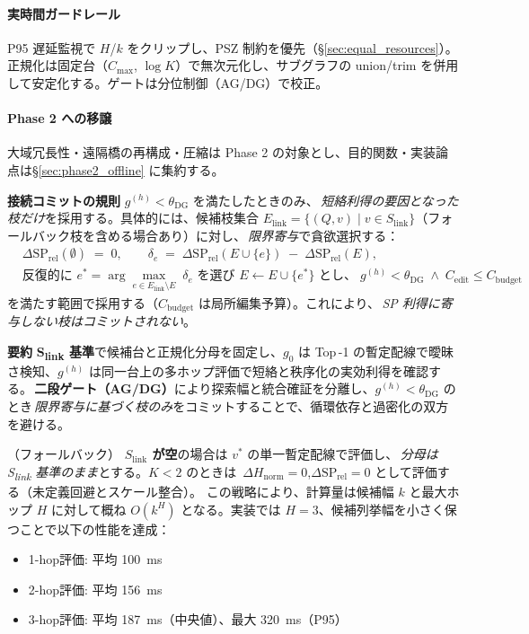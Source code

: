 \documentclass[ja=standard,xelatex]{bxjsarticle}
\begin{document}
\paragraph{実時間ガードレール}
P95 遅延監視で $H$/$k$ をクリップし、PSZ 制約を優先（\S\ref{sec:equal_resources}）。正規化は固定台（$C_{\max}$, $\log K$）で無次元化し、サブグラフの union/trim を併用して安定化する。ゲートは分位制御（AG/DG）で校正。

\paragraph{Phase 2 への移譲}
大域冗長性・遠隔橋の再構成・圧縮は Phase 2 の対象とし、目的関数・実装論点は\S\ref{sec:phase2_offline} に集約する。

\textbf{接続コミットの規則}\; $g^{(h)}<\theta_{\mathrm{DG}}$ を満たしたときのみ、\,\emph{短絡利得の要因となった枝だけ}を採用する。具体的には、候補枝集合 $E_{\mathrm{link}}{=}\{(Q,v)\mid v\in S_{\mathrm{link}}\}$（フォールバック枝を含める場合あり）に対し、\,\emph{限界寄与}で貪欲選択する：
\begin{align}
  &\Delta \mathrm{SP}_{\mathrm{rel}}(\emptyset)\;=\;0,\qquad
  \delta_e\;=\;\Delta \mathrm{SP}_{\mathrm{rel}}(E\cup\{e\})\;{-}\;\Delta \mathrm{SP}_{\mathrm{rel}}(E),\\
  &\text{反復的に } e^*{=}\arg\max_{e\in E_{\mathrm{link}}\setminus E}\;\delta_e \text{ を選び } E\leftarrow E\cup\{e^*\}\text{ とし、}\;g^{(h)}<\theta_{\mathrm{DG}}\;\land\; C_{\mathrm{edit}}\le C_{\mathrm{budget}}
\end{align}
を満たす範囲で採用する（$C_{\mathrm{budget}}$ は局所編集予算）。これにより、\,\emph{SP 利得に寄与しない枝はコミットされない}。

\textbf{要約}\; \textbf{S\textsubscript{link} 基準}で候補台と正規化分母を固定し、$g_0$ は Top\,\mbox{-}1 の暫定配線で曖昧さ検知、$g^{(h)}$ は同一台上の多ホップ評価で短絡と秩序化の実効利得を確認する。\,\textbf{二段ゲート（AG/DG）}により探索幅と統合確証を分離し、$g^{(h)}<\theta_{\mathrm{DG}}$ のとき\,\emph{限界寄与に基づく枝のみ}をコミットすることで、循環依存と過密化の双方を避ける。

\noindent （フォールバック）\; \textbf{$S_{\mathrm{link}}$ が空}の場合は $v^*$ の単一暫定配線で評価し、\,\emph{分母は S\textsubscript{link} 基準のまま}とする。$K{<}2$ のときは \,$\Delta H_{\mathrm{norm}}{=}0$,\;$\Delta\mathrm{SP}_{\mathrm{rel}}{=}0$ として評価する（未定義回避とスケール整合）。
この戦略により、計算量は候補幅 $k$ と最大ホップ $H$ に対して概ね $O(k^H)$ となる。実装では $H=3$、候補列挙幅を小さく保つことで以下の性能を達成：
\begin{itemize}
  \item 1-hop評価: 平均 \SI{100}{ms}
  \item 2-hop評価: 平均 \SI{156}{ms}
  \item 3-hop評価: 平均 \SI{187}{ms}（中央値）、最大 \SI{320}{ms}（P95）
\end{itemize}
\end{document}
